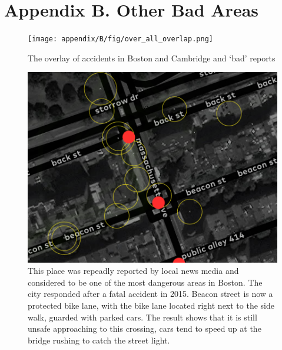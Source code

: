 \chapter{Appendix B. Other Bad Areas}
\label{appb:bad}
\begin{figure}
  \texttt{[image: appendix/B/fig/over\_all\_overlap.png]}               
  \caption[overlay of accidents and `bad reports']{The overlay of accidents in Boston and Cambridge and `bad' reports}
  \label{fig:bad_overlay}
\end{figure}

\begin{figure}[!htb]
  \includegraphics{appendix/B/fig/overlap_beacon.png}               
  \caption[dangerous crossing in Massachusetts Avenue at Beacon Street]{This place was repeadly reported by local news media and considered to be one of the most dangerous areas in Boston. The city responded after a fatal accident in 2015. Beacon street is now a protected bike lane, with the bike lane located right next to the side walk, guarded with parked cars. The result shows that it is still unsafe approaching to this crossing, cars tend to speed up at the bridge rushing to catch the street light.}
  \label{fig:bad_beacon}
\end{figure}

